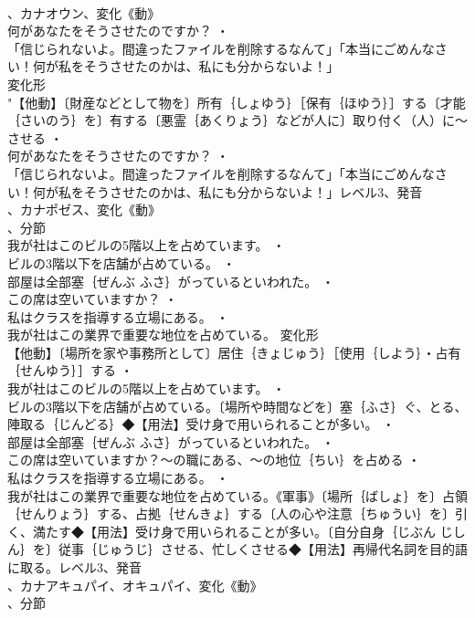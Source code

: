 \documentclass[8pt]{extreport}
\begin{document}
\begin{CJK}{UTF8}{min}
\\	、カナオウン、変化《動》
\\	何があなたをそうさせたのですか？ ・
\\	「信じられないよ。間違ったファイルを削除するなんて」「本当にごめんなさい！何が私をそうさせたのかは、私にも分からないよ！」
\\	変化形 
\\	"【他動】〔財産などとして物を〕所有｛しょゆう｝［保有｛ほゆう｝］する〔才能｛さいのう｝を〕有する〔悪霊｛あくりょう｝などが人に〕取り付く（人）に～させる ・
\\	何があなたをそうさせたのですか？ ・
\\	「信じられないよ。間違ったファイルを削除するなんて」「本当にごめんなさい！何が私をそうさせたのかは、私にも分からないよ！」レベル3、発音
\\	、カナポゼス、変化《動》
\\	、分節
\\	我が社はこのビルの5階以上を占めています。 ・
\\	ビルの3階以下を店舗が占めている。 ・
\\	部屋は全部塞｛ぜんぶ ふさ｝がっているといわれた。 ・
\\	この席は空いていますか？ ・
\\	私はクラスを指導する立場にある。 ・
\\	我が社はこの業界で重要な地位を占めている。	変化形 
\\	【他動】〔場所を家や事務所として〕居住｛きょじゅう｝［使用｛しよう｝・占有｛せんゆう｝］する ・
\\	我が社はこのビルの5階以上を占めています。 ・
\\	ビルの3階以下を店舗が占めている。〔場所や時間などを〕塞｛ふさ｝ぐ、とる、陣取る｛じんどる｝◆【用法】受け身で用いられることが多い。 ・
\\	部屋は全部塞｛ぜんぶ ふさ｝がっているといわれた。 ・
\\	この席は空いていますか？～の職にある、～の地位｛ちい｝を占める ・
\\	私はクラスを指導する立場にある。 ・
\\	我が社はこの業界で重要な地位を占めている。《軍事》〔場所｛ばしょ｝を〕占領｛せんりょう｝する、占拠｛せんきょ｝する〔人の心や注意｛ちゅうい｝を〕引く、満たす◆【用法】受け身で用いられることが多い。〔自分自身｛じぶん じしん｝を〕従事｛じゅうじ｝させる、忙しくさせる◆【用法】再帰代名詞を目的語に取る。レベル3、発音
\\	、カナアキュパイ、オキュパイ、変化《動》
\\	、分節

\end{CJK}
\end{document}
